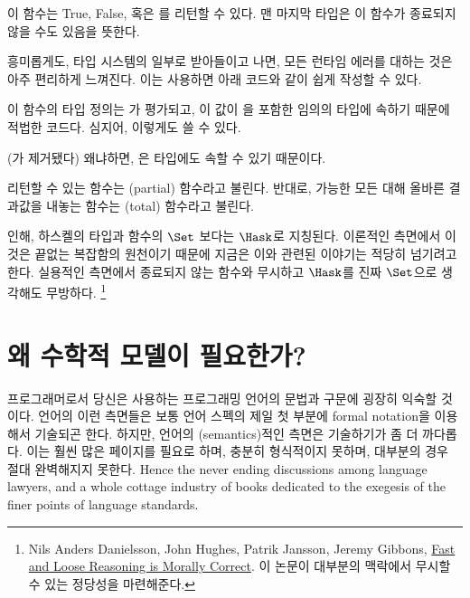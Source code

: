 이 함수는 True, False, 혹은 \code{\_|\_}를 리턴할 수 있다. 맨 마지막 타입은 이 함수가 종료되지 않을 수도 있음을 뜻한다.

흥미롭게도, \trBottom\을 타입 시스템의 일부로 받아들이고 나면, 모든 런타임 에러를 \trBottom{} 대하는 것은 아주 편리하게 느껴진다. 이는  \trExpression\을 사용하면 아래 코드와 같이 쉽게 작성할 수 있다.


이 함수의 타입 정의는 가 \trBottom{} 평가되고, 이 값이 을 포함한 임의의 타입에 속하기 때문에 적법한 코드다. 심지어, 이렇게도 쓸 수 있다.


(가 제거됐다) 왜냐하면, \trBottom 은  타입에도 속할 수 있기 때문이다.

\trBottom\을 리턴할 수 있는 함수는 \trPartial(partial) 함수라고 불린다. 반대로, 가능한 모든  대해 올바른 결과값을 내놓는 함수는 \trTotal(total) 함수라고 불린다.

\trBottom{} 인해, 하스켈의 타입과 함수의 \trCategory\는 $\Set$ 보다는 $\Hask$로 지칭된다.
이론적인 측면에서 이것은 끝없는 복잡함의 원천이기 때문에 지금은 이와 관련된 이야기는 적당히 넘기려고 한다. 실용적인 측면에서 종료되지 않는 함수와 \trBottom\을 무시하고 $\Hask$를 진짜 $\Set$으로 생각해도 무방하다.
\footnote{Nils Anders Danielsson,
John Hughes, Patrik Jansson, Jeremy Gibbons, \href{http://www.cs.ox.ac.uk/jeremy.gibbons/publications/fast+loose.pdf}{
Fast and Loose Reasoning is Morally Correct}. 이 논문이 대부분의 맥락에서 \trBottom\을 무시할 수 있는 정당성을 마련해준다.}

\section{왜 수학적 모델이 필요한가?}

프로그래머로서 당신은 사용하는 프로그래밍 언어의 문법과 구문에 굉장히 익숙할 것이다.
언어의 이런 측면들은 보통 언어 스펙의 제일 첫 부분에 formal notation을 이용해서 기술되곤 한다. %
하지만, 언어의 \trSemantics(semantics)적인 측면은 기술하기가 좀 더 까다롭다. 이는 훨씬 많은 페이지를 필요로 하며, 충분히 형식적이지 못하며, 대부분의 경우 절대 완벽해지지 못한다.
Hence the never ending discussions among language
lawyers, and a whole cottage industry of books dedicated to the exegesis
of the finer points of language standards.

